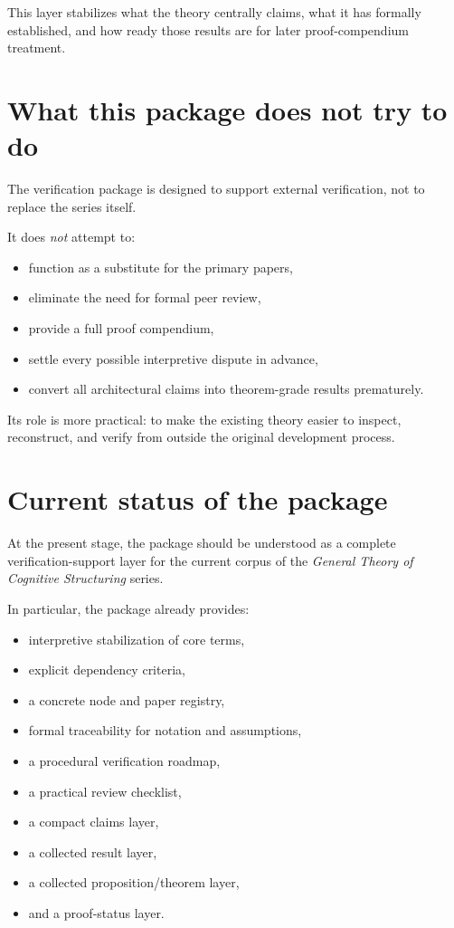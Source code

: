 \documentclass[12pt]{article}
\begin{document}
	This layer stabilizes what the theory centrally claims, what it has formally established, and
	how ready those results are for later proof-compendium treatment.
	
	\section{What this package does not try to do}
	
	The verification package is designed to support external verification, not to replace the series itself.
	
	It does \emph{not} attempt to:
	\begin{itemize}[leftmargin=2em]
		\item function as a substitute for the primary papers,
		\item eliminate the need for formal peer review,
		\item provide a full proof compendium,
		\item settle every possible interpretive dispute in advance,
		\item convert all architectural claims into theorem-grade results prematurely.
	\end{itemize}
	
	Its role is more practical: to make the existing theory easier to inspect, reconstruct, and
	verify from outside the original development process.
	
	\section{Current status of the package}
	
	At the present stage, the package should be understood as a complete verification-support layer
	for the current corpus of the \emph{General Theory of Cognitive Structuring} series.
	
	In particular, the package already provides:
	\begin{itemize}[leftmargin=2em]
		\item interpretive stabilization of core terms,
		\item explicit dependency criteria,
		\item a concrete node and paper registry,
		\item formal traceability for notation and assumptions,
		\item a procedural verification roadmap,
		\item a practical review checklist,
		\item a compact claims layer,
		\item a collected result layer,
		\item a collected proposition/theorem layer,
		\item and a proof-status layer.
	\end{itemize}
	
\end{document}
